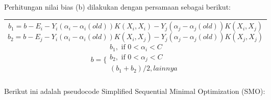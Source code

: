 \noindent Perhitungan nilai bias (b) dilakukan dengan persamaan sebagai berikut:
\begin{table}[H]
	\centering
	\small
	\begin{adjustbox}{width=1\textwidth}
	\begin{tabular}{|p{13.55cm}|}
		\hline
		\begin{equation}
		b_1=b-E_i-Y_i (\alpha_i-\alpha_i (old))K(X_i,X_i )-Y_j (\alpha_j-\alpha_j (old))K(X_i,X_j )
		\end{equation}
		\begin{equation}
		b_2=b-E_j-Y_i (\alpha_i-\alpha_i (old))K(X_i,X_j )-Y_j (\alpha_j-\alpha_j (old))K(X_j,X_j )
		\end{equation}
		\begin{equation}
			b= \bigg\{ 
			\begin{gathered}
			b_{1}, \textrm{ if } 0<\alpha _{i}<C \\
			b_{2}, \textrm{ if } 0< \alpha _{j}<C \\
			(b_{1}+b_{2})/2, lainnya \\
			\end{gathered}
		\end{equation}
		\\
		\hline		
	\end{tabular}
	\end{adjustbox}
\end{table}
\pagebreak
\noindent Berikut ini adalah pseudocode Simplified Sequential Minimal Optimization (SMO):

